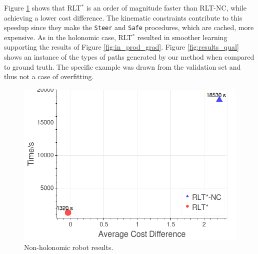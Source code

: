 \documentclass[letterpaper, 10 pt, conference]{ieeeconf}
\begin{document}
Figure \ref{fig:results_kino} shows that RLT$^*$ is an order of magnitude faster than RLT-NC, while achieving a lower cost difference. The kinematic constraints contribute to this speedup since they make the \texttt{Steer} and \texttt{Safe} procedures, which are cached, more expensive. As in the holonomic case, RLT$^*$ resulted in smoother learning supporting the results of Figure \ref{fig:in_prod_grad}. Figure \ref{fig:results_qual} shows an instance of the types of paths generated by our method when compared to ground truth. The specific example was drawn from the validation set and thus not a case of overfitting.
  	\begin{figure}[tbh]
	\centering
	\captionsetup[subfigure]{justification=centering}
	\hspace{-1cm}
    \includegraphics[scale=0.25]{images/pareto_front_kino.png}

    \caption{Non-holonomic robot results.}
    \vspace{-2mm}
  \label{fig:results_kino}
  \end{figure}
\end{document}
